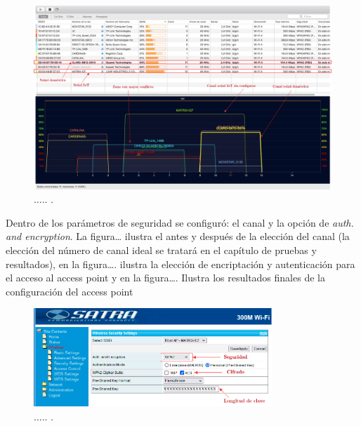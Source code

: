 \begin{landscape} %
\begin{figure}[htpb]
\centering 
\includegraphics[width=1.5\textwidth]{./Figures/wifi/01-doc.png}
\caption{..... .}
\label{fig:solapamiento}
\end{figure}
\end{landscape} %



Dentro de los parámetros de seguridad se configuró: el canal y la opción de \emph{auth. and encryption}. La figura… ilustra el antes y después de la elección del canal (la elección del número de canal ideal se tratará en el capítulo de pruebas y resultados), en la figura…. ilustra la elección de encriptación y autenticación para el acceso al access point y en la figura…. Ilustra los resultados finales de la configuración del access point

\begin{figure}[htpb]
\centering 
\includegraphics[width=0.8\textwidth]{./Figures/encriptacion.png}
\caption{..... .}
\label{fig:encriptacion}
\end{figure}

